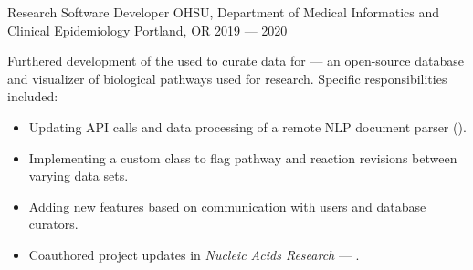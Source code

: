 \showoff
{Research Software Developer}
{OHSU, Department of Medical Informatics and Clinical Epidemiology}
{Portland, OR}
{2019 --- 2020}

Furthered development of the  used to curate data for  --- an open-source database and visualizer of biological pathways used for research. Specific responsibilities included:

\begin{itemize}[label=$\triangleright$]
    \item Updating API calls and data processing of a remote NLP document parser ().
    \item Implementing a custom class to flag pathway and reaction revisions between varying data sets.
    \item Adding new features based on communication with users and database curators.
    \item Coauthored project updates in \emph{Nucleic Acids Research} --- .
\end{itemize}

